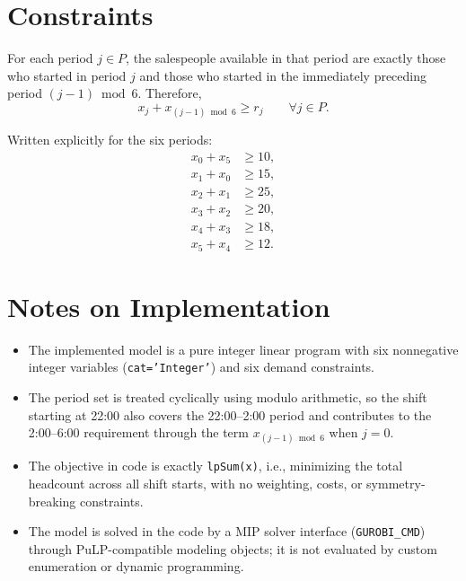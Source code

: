 \section*{Constraints}

For each period $j \in P$, the salespeople available in that period are exactly those who started in period $j$ and those who started in the immediately preceding period $(j-1)\bmod 6$. Therefore,
\[
x_j + x_{(j-1)\bmod 6} \ge r_j
\qquad \forall j \in P.
\]

Written explicitly for the six periods:
\begin{align*}
x_0 + x_5 &\ge 10,\\
x_1 + x_0 &\ge 15,\\
x_2 + x_1 &\ge 25,\\
x_3 + x_2 &\ge 20,\\
x_4 + x_3 &\ge 18,\\
x_5 + x_4 &\ge 12.
\end{align*}

\section*{Notes on Implementation}

\begin{itemize}
    \item The implemented model is a pure integer linear program with six nonnegative integer variables (\texttt{cat='Integer'}) and six demand constraints.
    \item The period set is treated cyclically using modulo arithmetic, so the shift starting at 22:00 also covers the 22:00--2:00 period and contributes to the 2:00--6:00 requirement through the term $x_{(j-1)\bmod 6}$ when $j=0$.
    \item The objective in code is exactly \texttt{lpSum(x)}, i.e., minimizing the total headcount across all shift starts, with no weighting, costs, or symmetry-breaking constraints.
    \item The model is solved in the code by a MIP solver interface (\texttt{GUROBI\_CMD}) through PuLP-compatible modeling objects; it is not evaluated by custom enumeration or dynamic programming.
\end{itemize}
